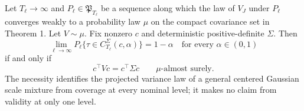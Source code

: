 Let \(T_\ell\to\infty\) and \(P_\ell\in\mathfrak P_{T_\ell}\) be a sequence along which the law of \(V_J\) under \(P_\ell\) converges weakly to a probability law \(\mu\) on the compact covariance set in Theorem 1. Let \(V\sim\mu\). Fix nonzero \(c\) and deterministic positive-definite \(\Sigma\). Then
\[
 \lim_{\ell\to\infty}P_\ell\{\tau\in C_{T_\ell}^{\Sigma}(c,\alpha)\}=1-\alpha
 \quad\text{for every }\alpha\in(0,1)
\]
if and only if
\[
 c^\top Vc=c^\top\Sigma c\qquad\mu\text{-almost surely}.
\]
The necessity identifies the projected variance law of a general centered Gaussian scale mixture from coverage at every nominal level; it makes no claim from validity at only one level.